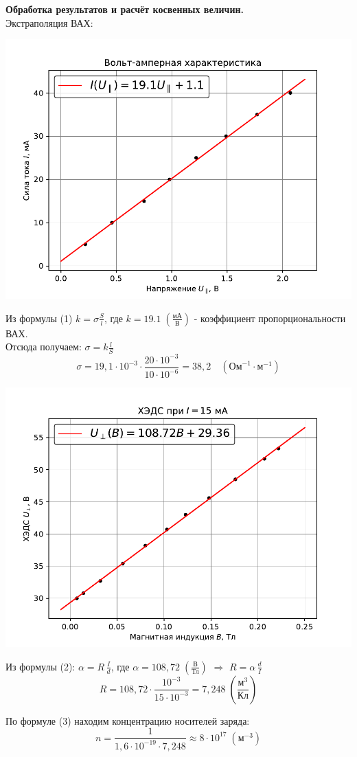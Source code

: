 \documentclass[a4paper]{article}
\begin{document}
{\parindent=0pt\textbf{Обработка результатов и расчёт косвенных величин.}}\\
Экстраполяция ВАХ:
\begin{center}
	\includegraphics[scale=0.6]{BAX}
\end{center}

Из формулы (1) $k=\sigma\frac{S}{l}$, где $k=19.1\;\left( \frac{\mbox{мА}}{\mbox{В}}\right) $ - коэффициент пропорциональности ВАХ.\\
 Отсюда получаем: $\sigma=k\frac{l}{S}$
 $$ \sigma=19,1\cdot10^{-3}\cdot\frac{20\cdot10^{-3}}{10\cdot10^{-6}}=38,2\quad(\mbox{Ом}^{-1}\cdot\mbox{м}^{-1})$$

\begin{center}
	\includegraphics[scale=0.6]{Hall}
\end{center}

Из формулы (2): $\alpha=R\,\frac{I}{d}$, где $\alpha = 108,72\;\left( \frac{\mbox{В}}{\mbox{Тл}}\right)$ $\Rightarrow$ $R=\alpha\,\frac{d}{I}$
$$ R=108,72\cdot\frac{10^{-3}}{15\cdot10^{-3}}=7,248\;\left( \frac{\mbox{м}^3}{\mbox{Кл}}\right) $$

По формуле (3) находим концентрацию носителей заряда:
$$n=\frac{1}{1,6\cdot10^{-19}\cdot7,248}\approx8\cdot10^{17}\;(\mbox{м}^{-3})$$


	
\end{document}
